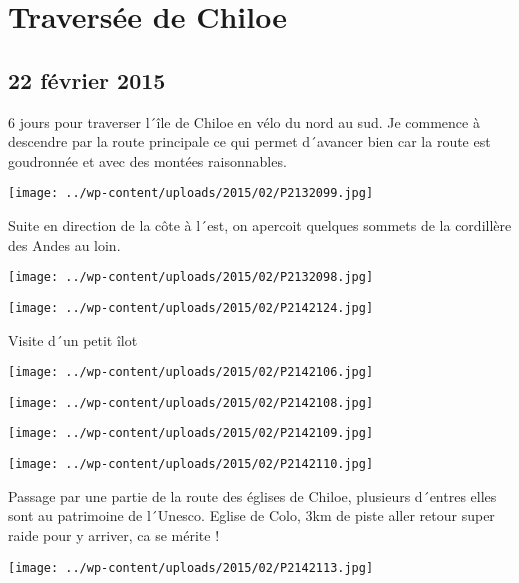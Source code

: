 \chapter{Traversée de Chiloe}
\section*{22 février 2015}
6 jours pour traverser l´île de Chiloe en vélo du nord au sud. \newline
 Je commence à descendre par la route principale ce qui permet d´avancer bien car la route est goudronnée et avec des montées raisonnables. \newline
 \newline
\centerline{\texttt{[image: ../wp-content/uploads/2015/02/P2132099.jpg]} } 
 \newline
 Suite en direction de la côte à l´est, on apercoit quelques sommets de la cordillère des Andes au loin. \newline
 \newline
\centerline{\texttt{[image: ../wp-content/uploads/2015/02/P2132098.jpg]} } 
 \newline
 \newline
\centerline{\texttt{[image: ../wp-content/uploads/2015/02/P2142124.jpg]} } 
 \newline
 Visite d´un petit îlot \newline
 \newline
\centerline{\texttt{[image: ../wp-content/uploads/2015/02/P2142106.jpg]} } 
 \newline
 \newline
\centerline{\texttt{[image: ../wp-content/uploads/2015/02/P2142108.jpg]} } 
 \newline
 \newline
\centerline{\texttt{[image: ../wp-content/uploads/2015/02/P2142109.jpg]} } 
 \newline
\centerline{\texttt{[image: ../wp-content/uploads/2015/02/P2142110.jpg]} } 
 \newline
 Passage par une partie de la route des églises de Chiloe, plusieurs d´entres elles sont au patrimoine de l´Unesco. \newline
 Eglise de Colo, 3km de piste aller retour super raide pour y arriver, ca se mérite ! \newline
 \newline
\centerline{\texttt{[image: ../wp-content/uploads/2015/02/P2142113.jpg]} } 

